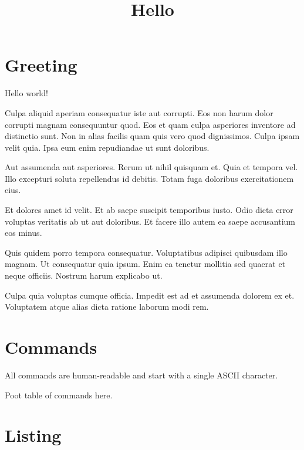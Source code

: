 \documentclass{article}
\begin{document}
\title{Hello}

\section{Greeting}
Hello world!



Culpa aliquid aperiam consequatur iste aut corrupti. Eos non harum dolor corrupti magnam consequuntur quod. Eos et quam culpa asperiores inventore ad distinctio sunt. Non in alias facilis quam quis vero quod dignissimos. Culpa ipsam velit quia. Ipsa eum enim repudiandae ut sunt doloribus.

Aut assumenda aut asperiores. Rerum ut nihil quisquam et. Quia et tempora vel. Illo excepturi soluta repellendus id debitis. Totam fuga doloribus exercitationem eius.

Et dolores amet id velit. Et ab saepe suscipit temporibus iusto. Odio dicta error voluptas veritatis ab ut aut doloribus. Et facere illo autem ea saepe accusantium eos minus.

Quis quidem porro tempora consequatur. Voluptatibus adipisci quibusdam illo magnam. Ut consequatur quia ipsum. Enim ea tenetur mollitia sed quaerat et neque officiis. Nostrum harum explicabo ut.

Culpa quia voluptas cumque officia. Impedit est ad et assumenda dolorem ex et. Voluptatem atque alias dicta ratione laborum modi rem.

\section{Commands}

All commands are human-readable and start with a single ASCII character.

Poot table of commands here.

\section{Listing}


\end{document}
